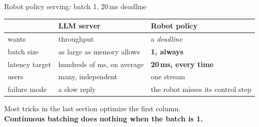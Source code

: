\documentclass[aspectratio=169,10pt]{beamer}
\newcommand{\warnc}[1]{\textcolor{warn}{\textbf{#1}}}
\begin{document}

\begin{frame}{Robot policy serving: batch 1, 20\,ms deadline}
  \vspace{0.3em}
  \begin{center}
    \begin{tabular}{lll}
      \toprule
       & \textbf{LLM server} & \textbf{Robot policy} \\
      \midrule
      wants        & throughput & a \emph{deadline} \\
      batch size   & as large as memory allows & \warnc{1, always} \\
      latency target & hundreds of ms, on average & \warnc{20\,ms, every time} \\
      users        & many, independent & one stream \\
      failure mode & a slow reply & the robot misses its control step \\
      \bottomrule
    \end{tabular}
  \end{center}
  \vspace{1.0em}
  \begin{center}
    \begin{minipage}{0.9\textwidth}
      \begin{alertblock}{}
        \centering
        Most tricks in the last section optimize the first column.\\
        \textbf{Continuous batching does nothing when the batch is 1.}
      \end{alertblock}
    \end{minipage}
  \end{center}
\end{frame}
\end{document}
